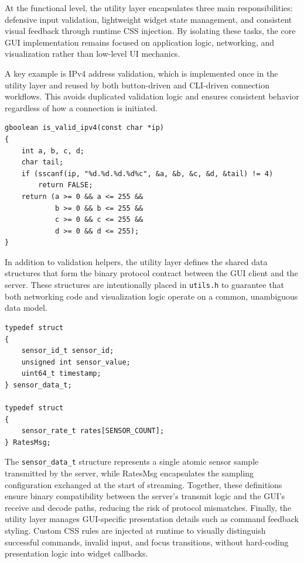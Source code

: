 At the functional level, the utility layer encapsulates three main responsibilities: defensive input validation, lightweight widget state management, and consistent visual feedback through runtime CSS injection. By isolating these tasks, the core GUI implementation remains focused on application logic, networking, and visualization rather than low-level UI mechanics.

A key example is IPv4 address validation, which is implemented once in the utility layer and reused by both button-driven and CLI-driven connection workflows. This avoids duplicated validation logic and ensures consistent behavior regardless of how a connection is initiated.
\begin{verbatim}
gboolean is_valid_ipv4(const char *ip)
{
    int a, b, c, d;
    char tail;
    if (sscanf(ip, "%d.%d.%d.%d%c", &a, &b, &c, &d, &tail) != 4)
        return FALSE;
    return (a >= 0 && a <= 255 &&
            b >= 0 && b <= 255 &&
            c >= 0 && c <= 255 &&
            d >= 0 && d <= 255);
}
\end{verbatim}

In addition to validation helpers, the utility layer defines the shared data structures that form the binary protocol contract between the GUI client and the server. These structures are intentionally placed in \texttt{utils.h} to guarantee that both networking code and visualization logic operate on a common, unambiguous data model.

\begin{verbatim}
typedef struct
{
    sensor_id_t sensor_id;
    unsigned int sensor_value;
    uint64_t timestamp;
} sensor_data_t;

typedef struct
{
    sensor_rate_t rates[SENSOR_COUNT];
} RatesMsg;
\end{verbatim}

The \texttt{sensor\_data\_t} structure represents a single atomic sensor sample transmitted by the server, while RatesMsg encapsulates the sampling configuration exchanged at the start of streaming. Together, these definitions ensure binary compatibility between the server’s transmit logic and the GUI’s receive and decode paths, reducing the risk of protocol mismatches.
Finally, the utility layer manages GUI-specific presentation details such as command feedback styling. Custom CSS rules are injected at runtime to visually distinguish successful commands, invalid input, and focus transitions, without hard-coding presentation logic into widget callbacks.

